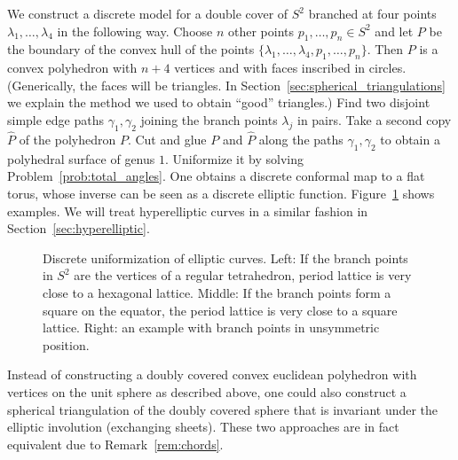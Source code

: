 \documentclass[Thesis]{subfiles}
\begin{document}

We construct a discrete model for a double cover of $S^{2}$ branched
at four points $\lambda_1,\ldots,\lambda_{4}$ in the following way.
Choose $n$ other points $p_1,\ldots,p_n\in S^2$ and let $P$ be the
boundary of the convex hull of the points
$\{\lambda_1,\ldots,\lambda_{4},p_1,\ldots,p_n\}$. Then $P$ is a
convex polyhedron with $n+4$ vertices and with faces inscribed in
circles. (Generically, the faces will be triangles. In
Section~\ref{sec:spherical_triangulations} we explain the method we
used to obtain ``good'' triangles.) Find two disjoint simple edge
paths $\gamma_1,\gamma_{2}$ joining the branch points $\lambda_{j}$ in
pairs. Take a second copy $\hat P$ of the polyhedron $P$. Cut and glue
$P$ and $\hat P$ along the paths $\gamma_1,\gamma_{2}$ to obtain a
polyhedral surface of genus $1$. Uniformize it by solving
Problem~\ref{prob:total_angles}. One obtains a discrete conformal map
to a flat torus, whose inverse can be seen as a discrete elliptic
function. Figure~\ref{fig:p_functions} shows examples. We will treat
hyperelliptic curves in a similar fashion in
Section~\ref{sec:hyperelliptic}.

\begin{figure}
\centering
{}
\caption{Discrete uniformization of elliptic curves. Left: If the
  branch points in $S^{2}$ are the vertices of a regular tetrahedron,
  period lattice is very close to a hexagonal lattice. Middle: If the
  branch points form a square on the equator, the period lattice is
  very close to a square lattice. Right: an example with branch points
  in unsymmetric position.}
\label{fig:p_functions}
\end{figure}

\begin{remark}
  Instead of constructing a doubly covered convex euclidean polyhedron
  with vertices on the unit sphere as described above, one could also
  construct a spherical triangulation of the doubly covered sphere
  that is invariant under the elliptic involution (exchanging
  sheets). These two approaches are in fact equivalent due to
  Remark~\ref{rem:chords}. 
\end{remark}
\end{document}
